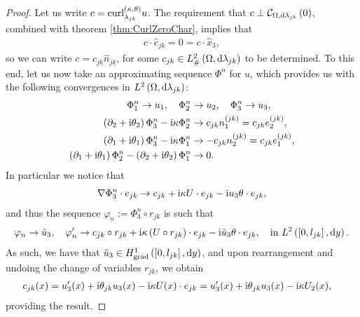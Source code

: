 \begin{proof}
	Let us write $c = \mathrm{curl}_{\lambda_{jk}}^{\left( \kappa, \theta \right)}u$.
	The requirement that $c\perp\mathcal{C}_{ \Omega, \mathrm{d}\lambda_{jk}}\left( 0 \right)$, combined with theorem \ref{thm:CurlZeroChar}, implies that
	\begin{align*}
		c\cdot\widehat{e}_{jk} = 0 = c\cdot\widehat{x}_3,
	\end{align*}
	so we can write $c = c_{jk}\widehat{n}_{jk}$, for some $c_{jk}\in L^2_{\#}\left( \Omega,\mathrm{d} \lambda_{jk} \right)$ to be determined.
	To this end, let us now take an approximating sequence $\Phi^n$ for $u$, which provides us with the following convergences in $L^{2}\left( \Omega,\mathrm{d} \lambda_{jk} \right)$:
	\begin{align*}
		\Phi^n_1 \rightarrow u_1, \quad 
		\Phi^n_2 &\rightarrow u_2, \quad
		\Phi^n_3 \rightarrow u_3, \\
		\left( \partial_2+\mathrm{i}\theta_2 \right)\Phi^n_3 - \mathrm{i}\kappa\Phi^n_2 &\rightarrow c_{jk}n_1^{(jk)} = c_{jk}e_2^{(jk)}, \\
		\left( \partial_1+\mathrm{i}\theta_1 \right)\Phi^n_3 - \mathrm{i}\kappa\Phi^n_1 &\rightarrow -c_{jk}n_2^{(jk)} = c_{jk}e_1^{(jk)}, \\
		\left( \partial_1 + \mathrm{i}\theta_1 \right)\Phi^n_2 - \left( \partial_2+\mathrm{i}\theta_2 \right)\Phi^n_1 &\rightarrow 0.
	\end{align*}
	In particular we notice that
	\begin{align*}
		\nabla\Phi^n_3\cdot e_{jk} \rightarrow c_{jk} + \mathrm{i}\kappa U\cdot e_{jk} - \mathrm{i} u_3\theta\cdot e_{jk},
	\end{align*}
	and thus the sequence $\varphi_n := \Phi^n_3\circ r_{jk}$ is such that
	\begin{align*}
		\varphi_n\rightarrow\tilde{u}_3, \quad
		\varphi_n'\rightarrow c_{jk}\circ r_{jk} + \mathrm{i}\kappa\left( U\circ r_{jk} \right)\cdot e_{jk} - \mathrm{i}\tilde{u}_3\theta\cdot e_{jk}, \quad
		\text{in } L^{2}\left( \left[ 0,l_{jk} \right],\mathrm{d} y \right).
	\end{align*}
	As such, we have that $\tilde{u}_3\in H^1_\mathrm{grad}\left( \left[ 0,l_{jk} \right], \mathrm{d}y \right)$, and upon rearrangement and undoing the change of variables $r_{jk}$, we obtain
	\begin{align*}
		c_{jk}(x) &= u_3'(x) + \mathrm{i}\theta_{jk}u_3(x) - \mathrm{i}\kappa U(x)\cdot e_{jk}
		= u_3'(x) + \mathrm{i}\theta_{jk}u_3(x) - \mathrm{i}\kappa U_2(x),
	\end{align*}
	providing the result.
\end{proof}


